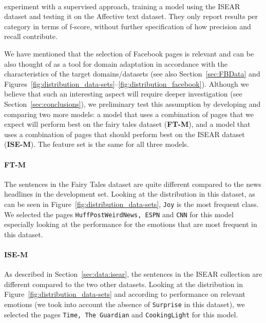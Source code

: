 \documentclass[11pt]{article}
\begin{document}
\paragraph{} experiment with a supervised approach, training a model using the ISEAR dataset and testing it on the Affective text dataset. They only report results per category in terms of f-score, without further specification of how precision and recall contribute.

\bigskip

We have mentioned that the selection of Facebook pages is relevant and can be also thought of as a tool for domain adaptation in accordance with the characteristics of the target domains/datasets (see also Section~\ref{sec:FBData} and Figures~\ref{fig:distribution_data-sets}--\ref{fig:distribution_facebook}). Although we believe that such an interesting aspect will require deeper investigation (see Section~\ref{sec:conclusions}), we preliminary test this assumption by developing and comparing two more models: a model that uses a combination of pages that we expect will perform best on the fairy tales dataset (\textbf{FT-M}), and a model that uses a combination of pages that should perform best on the ISEAR dataset (\textbf{ISE-M}). The feature set is the same for all three models.



\paragraph{FT-M}
The sentences in the Fairy Tales dataset are quite different compared to the news headlines in the development set. Looking at the distribution in this dataset, as can be seen in Figure~\ref{fig:distribution_data-sets}, \texttt{Joy} is the most frequent class. We selected the pages \texttt{HuffPostWeirdNews, ESPN} and \texttt{CNN} for this model especially looking at the performance for the emotions that are most frequent in this dataset.



\paragraph{ISE-M}
As described in Section~\ref{sec:data:isear}, the sentences in the ISEAR collection are different compared to the two other datasets. Looking at the distribution in Figure~\ref{fig:distribution_data-sets} and according to performance on relevant emotions (we took into account the absence of \texttt{Surprise} in this dataset), we selected the pages \texttt{Time, The Guardian} and \texttt{CookingLight} for this model. 
\end{document}
